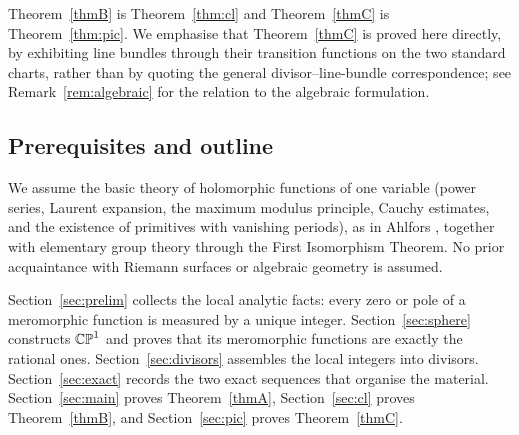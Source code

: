 Theorem~\ref{thmB} is Theorem~\ref{thm:cl} and Theorem~\ref{thmC} is
Theorem~\ref{thm:pic}. We emphasise that Theorem~\ref{thmC} is proved here
directly, by exhibiting line bundles through their transition functions on the
two standard charts, rather than by quoting the general divisor--line-bundle
correspondence; see Remark~\ref{rem:algebraic} for the relation to the algebraic
formulation.

\subsection{Prerequisites and outline}

We assume the basic theory of holomorphic functions of one variable (power series,
Laurent expansion, the maximum modulus principle, Cauchy estimates, and the
existence of primitives with vanishing periods), as in Ahlfors \cite{Ahlfors},
together with elementary group theory through the First Isomorphism Theorem. No
prior acquaintance with Riemann surfaces or algebraic geometry is assumed.

Section~\ref{sec:prelim} collects the local analytic facts: every zero or pole of
a meromorphic function is measured by a unique integer. Section~\ref{sec:sphere}
constructs $\mathbb{CP}^1$ and proves that its meromorphic functions are exactly the
rational ones. Section~\ref{sec:divisors} assembles the local integers into
divisors. Section~\ref{sec:exact} records the two exact sequences that organise
the material. Section~\ref{sec:main} proves Theorem~\ref{thmA},
Section~\ref{sec:cl} proves Theorem~\ref{thmB}, and Section~\ref{sec:pic} proves
Theorem~\ref{thmC}.

